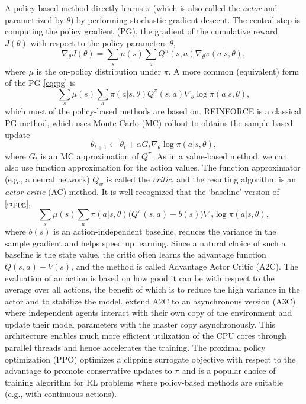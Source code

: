 \documentclass{article}
\begin{document}
A policy-based method directly learns $\pi$ (which is also called the \emph{actor} and parametrized by $\theta$) by performing stochastic gradient descent. The central step is computing the policy gradient (PG), the gradient of the cumulative reward $J(\theta)$ with respect to the policy parameters $\theta$,
\begin{equation}\label{eq:pg}
    \nabla_\theta J(\theta) = \sum_s \mu(s)\sum_a Q^\pi(s,a)\nabla_\theta\pi(a|s,\theta),
\end{equation}
where $\mu$ is the on-policy distribution under $\pi$. A more common (equivalent) form of the PG \eqref{eq:pg} is
\begin{equation}
    \sum_s \mu(s)\sum_a \pi(a|s,\theta) Q^\pi(s,a)\nabla_\theta\log\pi(a|s,\theta),
\end{equation}
which most of the policy-based methods are based on.
REINFORCE \citep{williams1992simple} is a classical PG method, which uses Monte Carlo (MC) rollout to obtains the sample-based update
\begin{equation}
    \theta_{t+1} \leftarrow \theta_t + \alpha G_t \nabla_\theta\log\pi(a|s,\theta),
\end{equation}
where $G_t$ is an MC approximation of $Q^\pi$. 
As in a value-based method, we can also use function approximation for the action values. The function approximator (e.g., a neural network) $Q_w$ is called the \emph{critic}, and the resulting algorithm is an \emph{actor-critic} (AC) method.
It is well-recognized that the `baseline' version of \eqref{eq:pg}, 
\begin{equation}
    \sum_s \mu(s)\sum_a \pi(a|s,\theta) \bigg(Q^\pi(s,a)-b(s)\bigg)\nabla_\theta\log\pi(a|s,\theta),
\end{equation}
where $b(s)$ is an action-independent baseline,
reduces the variance in the sample gradient and helps speed up learning. Since a natural choice of such a baseline is the state value, the critic often learns the advantage function $Q(s,a)-V(s)$, and the method is called Advantage Actor Critic (A2C). The evaluation of an action is based on how good it can be with respect to the average over all actions, the benefit of which is to reduce the high variance in the actor and to stabilize the model. \cite{mnih2016asynchronous} extend A2C to an asynchronous version (A3C) where independent agents interact with their own copy of the environment and update their model parameters with the master copy asynchronously. This architecture enables much more efficient utilization of the CPU cores through parallel threads and hence accelerates the training. The proximal policy optimization (PPO) \citep{schulman2017proximal} optimizes a clipping surrogate objective with respect to the advantage to promote conservative updates to $\pi$ and is a popular choice of training algorithm for RL problems where policy-based methods are suitable (e.g., with continuous actions).
\end{document}
